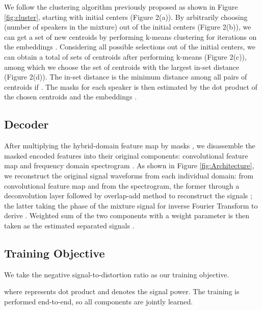 \documentclass[a4paper]{article}
\begin{document}
We follow the clustering algorithm previously proposed \cite{luo2018speaker} as shown in Figure \ref{fig:cluster}, starting with  initial centers  (Figure 2(a)). By arbitrarily choosing  (number of speakers in the mixture) out of the  initial centers (Figure 2(b)), we can get a set of  new centroids by performing k-means clustering for  iterations on the embeddings . Considering all  possible selections out of the  initial centers, we can obtain a total of  sets of centroids after performing k-means (Figure 2(c)), among which we choose the set of centroids  with the largest in-set distance (Figure 2(d)). The in-set distance is the minimum distance among all pairs of centroids if . The masks for each speaker  is then estimated by the dot product of the chosen centroids  and the embeddings .















\subsection{Decoder}

After multiplying the hybrid-domain feature map  by masks , we disassemble the masked encoded features into their original components: convolutional feature map  and frequency domain spectrogram . As shown in Figure \ref{fig:Architecture}, we reconstruct the original signal waveforms from each individual domain:  from convolutional feature map and  from the spectrogram, the former through a deconvolution layer followed by overlap-add method to reconstruct the signals ; the latter taking the phase of the mixture signal for inverse Fourier Transform to derive . Weighted sum of the two components with a weight parameter  is then taken as the estimated separated signals . 



\subsection{Training Objective}

We take the negative signal-to-distortion ratio as our training objective.




where  represents dot product and  denotes the signal power. The training is performed end-to-end, so all components are jointly learned.
\end{document}
